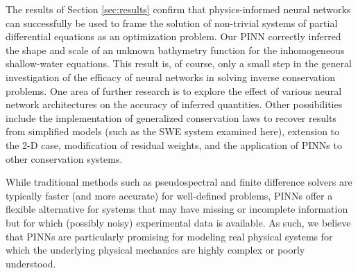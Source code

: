 The results of Section \ref{sec:results} confirm that physics-informed neural networks can successfully be used to frame
the solution of non-trivial systems of partial differential equations as an optimization problem. Our PINN correctly 
inferred the shape and scale of an unknown bathymetry function for the inhomogeneous shallow-water equations. This 
result is, of course, only a small step in the general investigation of the efficacy of neural networks in solving 
inverse conservation problems. One area of further research is to explore the effect of various neural network 
architectures on the accuracy of inferred quantities. Other possibilities include the implementation of generalized 
conservation laws to recover results from simplified models (such as the SWE system examined here), extension to the 2-D
case, modification of residual weights, and the application of PINNs to other conservation systems.

While traditional methods such as pseudospectral and finite 
difference solvers are typically faster (and more accurate) for well-defined problems, PINNs offer a flexible 
alternative for systems that may have missing or incomplete information but for which (possibly noisy) experimental 
data is available. As such, we believe that PINNs are particularly promising for modeling real physical systems for 
which the underlying physical mechanics are highly complex or poorly understood. 

